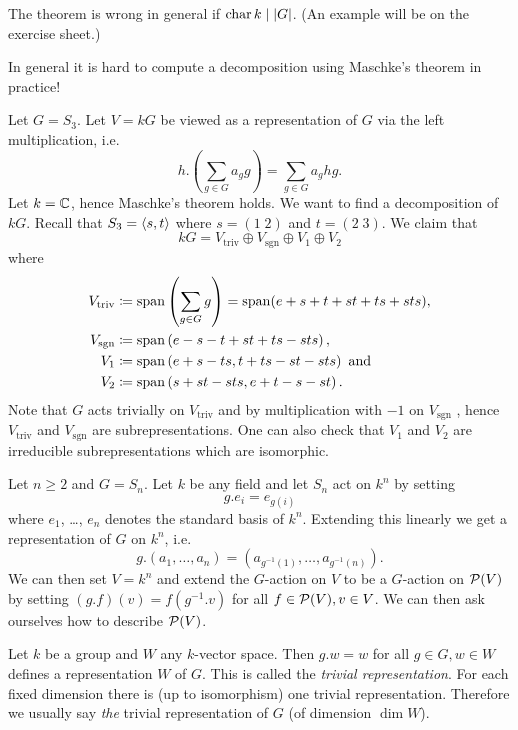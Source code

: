 \begin{warn}
 The theorem is wrong in general if $\operatorname{char} k \mid |G|$. (An example will be on the exercise sheet.)
\end{warn}

\begin{expl}
 In general it is hard to compute a decomposition using Maschke’s theorem in practice!
 
 Let $G = S_3$. Let $V = kG$ be viewed as a representation of $G$ via the left multiplication, i.e.
 \[
  h.\left(\sum_{g \in G} a_g g\right) = \sum_{g \in G} a_g hg.
 \]
 Let $k = \mathbb{C}$, hence Maschke’s theorem holds. We want to find a decomposition of $kG$. Recall that $S_3 = \left\langle s,t \right\rangle$ where $s = (1 \; 2)$ and $t = (2 \; 3)$. We claim that
 \[
  kG = V_{\text{triv}} \oplus V_{\text{sgn}} \oplus V_1 \oplus V_2
 \]
 where
 \begin{align*}
  V_{\text{triv}} &\coloneqq \operatorname{span}\left(\sum_{g \in G} g \right) = \operatorname{span}(e+s+t+st+ts+sts), \\
  V_{\text{sgn}} &\coloneqq \operatorname{span}\left(e-s-t+st+ts-sts\right), \\
  V_1 &\coloneqq \operatorname{span}\left(e+s-ts, t+ts-st-sts\right) \text{ and} \\
  V_2 &\coloneqq \operatorname{span}\left(s+st-sts,e+t-s-st\right).
 \end{align*}
 Note that $G$ acts trivially on $V_{\text{triv}}$ and by multiplication with $-1$ on $V_{\text{sgn}}$ , hence $V_{\text{triv}}$ and $V_{\text{sgn}}$ are subrepresentations. One can also check that $V_1$ and $V_2$ are irreducible subrepresentations which are isomorphic.
\end{expl}


\begin{expl}
 Let $n \geq 2$ and $G = S_n$. Let $k$ be any field and let $S_n$ act on $k^n$ by setting
 \[
  g.e_i = e_{g(i)}
 \]
 where $e_1$, \dots, $e_n$ denotes the standard basis of $k^n$. Extending this linearly we get a representation of $G$ on $k^n$, i.e.
 \[
  g.(a_1, \dotsc, a_n) = \left(a_{g^{-1}(1)}, \dotsc, a_{g^{-1}(n)}\right).
 \]
 We can then set $V = k^n$ and extend the $G$-action on $V$ to be a $G$-action on $\mathcal{P}(V)$ by setting $(g.f)(v) = f(g^{-1}.v)$ for all $f \in \mathcal{P}(V), v \in V$. We can then ask ourselves how to describe $\mathcal{P}(V)$.
\end{expl}


\begin{defi}
 Let $k$ be a group and $W$ any $k$-vector space. Then $g.w = w$ for all $g \in G, w \in W$ defines a representation $W$ of $G$. This is called the \emph{trivial representation}. For each fixed dimension there is (up to isomorphism) one trivial representation. Therefore we usually say \emph{the} trivial representation of $G$ (of dimension $\dim W$).
\end{defi}


